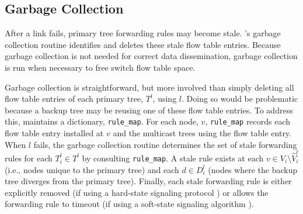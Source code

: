 \subsection{Garbage Collection}
\label{subsec:garbage}

After a link fails, primary tree forwarding rules may become stale. \mdrs's garbage collection routine identifies and deletes these stale flow table entries. 
Because garbage collection is not needed for correct data dissemination, garbage collection is run when necessary to free switch flow table space. 

Garbage collection is straightforward, but more involved than simply deleting all flow table entries of each primary tree, $T^l$, using $l$.  Doing so would be problematic 
because a backup tree may be reusing one of these flow table entries.  To address this, \mdr maintains a dictionary, {\tt rule\_map}.  For each node, $v$, {\tt rule\_map} records
each flow table entry installed at $v$ and the multicast trees using the flow table entry. %
When $l$ fails, the garbage collection routine determines the set of stale forwarding rules for each $T^l_i \in T^l$ by consulting  {\tt rule\_map}.
A stale rule exists at each $v \in V_i \setminus \hat{V}_i^l$ (i.e., nodes unique to the primary tree) and each $d \in D_i^l$ (nodes where the backup tree diverges from the primary tree).
Finally, each stale forwarding rule is either explicitly removed (if using a hard-state signaling protocol \cite{Ji03}) 
or \mdr allows the forwarding rule to timeout (if using a soft-state signaling algorithm \cite{Clark88}).



